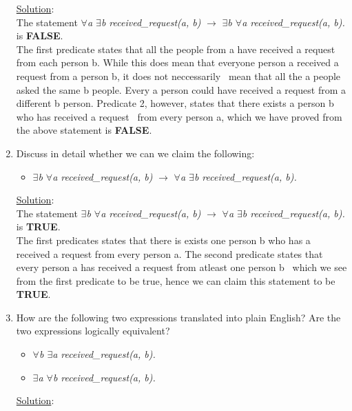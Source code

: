 \begin{enumerate}
    \noindent \underline{Solution}:\\ The statement \emph{$\forall$a $\exists$b received\_request(a, b)} $\rightarrow$ \emph{$\exists$b $\forall$a received\_request(a, b).} is \textbf{FALSE}.\\
    The first predicate states that all the people from a have received a request from each person b. While this does mean that everyone person a received a request from a person b, it does not neccessarily \
    mean that all the a people asked the same b people. Every a person could have received a request from a different b person. Predicate 2, however, states that there exists a person b who has received a request \
    from every person a, which we have proved from the above statement is \textbf{FALSE}.
  
  \item Discuss in detail whether we can we claim the following:\
    \begin{itemize}
      \item[] \emph{$\exists$b $\forall$a received\_request(a, b)} $\rightarrow$ \emph{$\forall$a $\exists$b received\_request(a, b).}
    \end{itemize}

  \noindent \underline{Solution}:\\ The statement \emph{$\exists$b $\forall$a received\_request(a, b)} $\rightarrow$ \emph{$\forall$a $\exists$b received\_request(a, b).} is \textbf{TRUE}. \\
  The first predicates states that there is exists one person b who has a received a request from every person a. The second predicate states that every person a has received a request from atleast one person b \
  which we see from the first predicate to be true, hence we can claim this statement to be \textbf{TRUE}.

  \item How are the following two expressions translated into plain English? Are the two
  expressions logically equivalent?
    \begin{itemize}
      \item \emph{$\forall$b $\exists$a received\_request(a, b).}
      \item \emph{$\exists$a $\forall$b received\_request(a, b).}
    
    \end{itemize}

    \noindent \underline{Solution}:\\
    

    
\end{enumerate}   
 